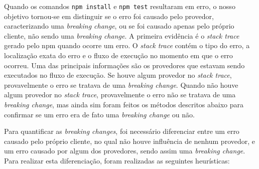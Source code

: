 Quando os comandos \texttt{npm install} e \texttt{npm test} resultaram em erro, o nosso objetivo tornou-se em distinguir se o erro foi causado pelo provedor, caracterizando uma \textit{breaking change}, ou se foi causado apenas pelo próprio cliente, não sendo uma \textit{breaking change}. A primeira evidência é o \textit{stack trace} gerado pelo \textsf{npm} quando ocorre um erro. O \textit{stack trace} contém o tipo do erro, a localização exata do erro e o fluxo de execução no momento em que o erro ocorreu. Uma das principais informações são os provedores que estavam sendo executados no fluxo de execução. Se houve algum provedor no \textit{stack trace}, provavelmente o erro se tratava de uma \textit{breaking change}. Quando não houve algum provedor no \textit{stack trace}, provavelmente o erro não se tratava de uma \textit{breaking change}, mas ainda sim foram feitos os métodos descritos abaixo para confirmar se um erro era de fato uma \textit{breaking change} ou não.

Para quantificar as \textit{breaking changes}, foi necessário diferenciar entre um erro causado pelo próprio cliente, no qual não houve influência de nenhum provedor, e um erro causado por algum dos provedores, sendo assim uma \textit{breaking change}. Para realizar esta diferenciação, foram realizadas as seguintes heurísticas:

